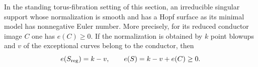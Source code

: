 
\begin{proposition}[P4R.5]\hypertarget{tag-02YH}{}\label{night:P4R.5}\label{stmt:P4R.5}


In the standing torus-fibration setting of this section, an irreducible singular
support whose normalization is smooth and has a Hopf
surface as its minimal model has nonnegative Euler
number. More precisely, for its reduced conductor
image $C$ one has $e(C)\ge0$. If the normalization is
obtained by $k$ point blowups and $v$ of the exceptional
curves belong to the conductor, then
\[
 e(S_{\rm reg})=k-v,\qquad
 e(S)=k-v+e(C)\ge0.
\]
\end{proposition}

